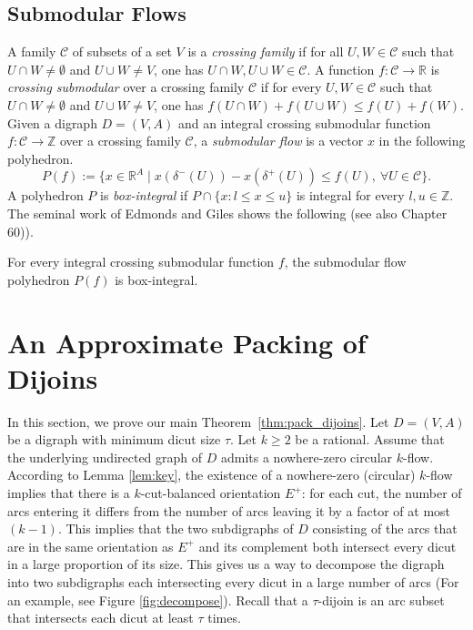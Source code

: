 \documentclass[runningheads]{llncs}
\newcommand{\R}{\mathbb{R}}
\newcommand{\Z}{\mathbb{Z}}
\begin{document}
\subsection{Submodular Flows}
A family $\mathcal{C}$ of subsets of a set $V$ is a \emph{crossing family} if for all $U, W\in \mathcal{C}$ such that $U\cap W\neq \emptyset$ and $U\cup W\neq V$, one has $U\cap W, U\cup W\in \mathcal{C}$. A function $f:\mathcal{C}\rightarrow \R$ is \emph{crossing submodular} over a crossing family $\mathcal{C}$ if for every $U,W\in\mathcal{C}$ such that $U\cap W\neq \emptyset$ and $U\cup W\neq V$, one has $f(U\cap W)+f(U\cup W)\leq f(U)+f(W)$. Given a digraph $D=(V,A)$ and an integral crossing submodular function $f:\mathcal{C}\rightarrow \Z$ over a crossing family $\mathcal{C}$, a \emph{submodular flow} is a vector $x$ in the following polyhedron. 
\[
P(f):=\big\{x\in \R^A \mid x(\delta^-(U))-x(\delta^+(U))\leq f(U),\ \forall U\in\mathcal{C}\big\}.
\]
A polyhedron $P$ is \emph{box-integral} if $P\cap \{x: l\leq x\leq u\}$ is integral for every $l,u\in \Z$. 
The seminal work of Edmonds and Giles \cite{edmonds1977min} shows the following (see also \cite{schrijver2003combinatorial} Chapter 60)).
\begin{theorem}\label{thm:submodular-flow}
     For every integral crossing submodular function $f$, the submodular flow polyhedron $P(f)$ is box-integral.
\end{theorem}




\section{An Approximate Packing of Dijoins}\label{sec:approx}
In this section, we prove our main Theorem~\ref{thm:pack_dijoins}.
Let $D=(V,A)$ be a digraph with minimum dicut size $\tau$.
Let  $k\geq 2$ be a rational.
Assume that the underlying undirected graph of $D$ admits a nowhere-zero circular $k$-flow. 
According to Lemma \ref{lem:key}, the existence of a nowhere-zero (circular) $k$-flow implies that there is a $k$-cut-balanced orientation $E^+$: for each cut, the number of arcs entering it differs from the number of arcs leaving it by a factor of at most $(k-1)$. This implies that the two subdigraphs of $D$ consisting of the arcs that are in the same orientation as $E^+$ and its complement both intersect every dicut in a large proportion of its size. This gives us a way to decompose the digraph into two subdigraphs each intersecting every dicut in a large number of arcs (For an example, see Figure \ref{fig:decompose}). Recall that a
$\tau$-dijoin is an arc subset that intersects each dicut at least $\tau$ times.
\end{document}
